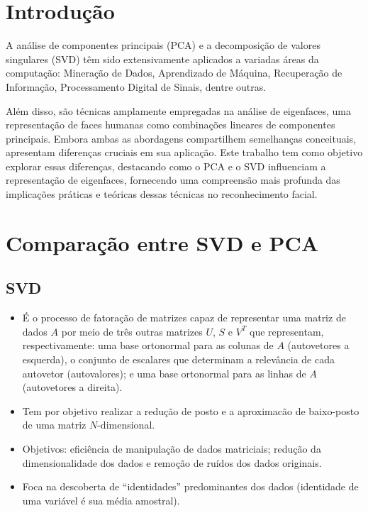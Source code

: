 \documentclass[12pt]{article}
\begin{document}
    
    \begin{titlepage} 
        
    \end{titlepage}
    \newpage
    
    \tableofcontents %
    \newpage 
    
    \section{Introdução}
        
        
        A análise de componentes principais (PCA) e a decomposição de valores singulares (SVD)
        têm sido  extensivamente  aplicados  a  variadas áreas  da  computação: Mineração de Dados, Aprendizado de Máquina, Recuperação de Informação, Processamento Digital de Sinais, dentre outras. 
        
        
        Além disso, são técnicas amplamente empregadas na análise de eigenfaces, uma representação de faces humanas como combinações lineares de componentes principais. Embora ambas as abordagens compartilhem semelhanças conceituais, apresentam diferenças cruciais em sua aplicação. Este trabalho tem como objetivo explorar essas diferenças, destacando como o PCA e o SVD influenciam a representação de eigenfaces, fornecendo uma compreensão mais profunda das implicações práticas e teóricas dessas técnicas no reconhecimento facial.

    \section{Comparação entre SVD e PCA}
        \subsection{SVD} 
                \begin{itemize}
                    \item É o processo de fatoração de matrizes capaz de representar uma matriz de dados $A$ por meio de três outras matrizes $U$, $S$ e $V^{T}$ que representam, respectivamente:  uma  base  ortonormal para as colunas  de $A$ (autovetores  a esquerda), o conjunto de escalares que determinam a relevância de cada autovetor (autovalores); e uma base ortonormal para as linhas de $A$ (autovetores a direita). 
                    \item  Tem  por  objetivo  realizar  a  redução  de  posto  e  a  aproximacão  de  baixo-posto  de  uma  matriz $N$-dimensional. 
                    \item Objetivos: eficiência  de  manipulação  de dados matriciais; redução da dimensionalidade dos dados e remoção de ruídos dos dados originais.
                    \item Foca na descoberta de “identidades” predominantes dos dados (identidade de uma variável é sua média amostral).
                \end{itemize}
\end{document}
